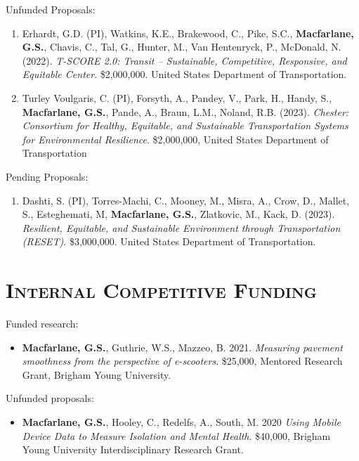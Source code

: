 \documentclass[margin,line]{res}
\newcounter{enuminitialize}
\newenvironment{myenum}[1][]
{%
 \setcounter{enuminitialize}{#1}
 \addtocounter{enuminitialize}{2}
 \begin{enumerate}[left= 4pt, itemsep=12pt, start=\value{enuminitialize}, label=\arabic*\addtocounter{enumi}{-2}]
}
{%
 \end{enumerate}
}
\newcommand{\secfont}{\scshape }
\begin{document}
\begin{resume}
Unfunded Proposals:
\vspace{0.3cm}
\begin{myenum}[2]
  \item{Erhardt, G.D. (PI), Watkins, K.E., Brakewood, C.,  Pike, S.C., \textbf{Macfarlane, G.S.}, Chavis, C., Tal, G., Hunter, M., Van Hentenryck, P., McDonald, N. (2022). \textit{T-SCORE 2.0: Transit – Sustainable, Competitive, Responsive, and Equitable Center}. \$2,000,000. United States Department of Transportation.}
  \item{Turley Voulgaris, C.  (PI), Forsyth, A., Pandey, V., Park, H., Handy, S., \textbf{Macfarlane, G.S.}, Pande, A., Braun, L.M., Noland, R.B. (2023). \textit{Chester: Consortium for Healthy, Equitable, and Sustainable Transportation Systems for Environmental Resilience}. \$2,000,000, United States Department of Transportation}
\end{myenum}

Pending Proposals:
\begin{myenum}[1]
  \item{Dashti, S. (PI), Torres-Machi, C., Mooney, M., Misra, A., Crow, D., Mallet, S., Esteghemati, M, \textbf{Macfarlane, G.S.}, Zlatkovic, M., Kack, D. (2023). \textit{Resilient, Equitable, and Sustainable Environment through Transportation (RESET)}. \$3,000,000. United States Department of Transportation.}
\end{myenum}

\section{\secfont{Internal Competitive Funding}}
Funded research:
\begin{itemize}
  \item {\textbf{Macfarlane, G.S.}, Guthrie, W.S., Mazzeo, B. 2021. \textit{ Measuring pavement smoothness from the perspective of e-scooters}. \$25,000, Mentored Research Grant, Brigham Young University.}
\end{itemize}

Unfunded proposals:
\begin{itemize}
  \item{\textbf{Macfarlane, G.S.}, Hooley, C., Redelfs, A., South, M. 2020 \textit{ Using Mobile Device Data to Measure Isolation and Mental Health}}.
  \$40,000, Brigham Young University Interdisciplinary Research Grant.
\end{itemize}

\noindent\makebox[\linewidth]{\rule{\linewidth}{0.4pt}}

\end{resume}
\end{document}
